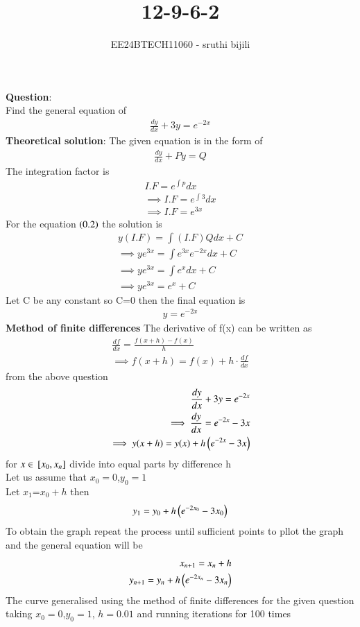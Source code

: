 \documentclass[journal]{IEEEtran}
\begin{document}

\vspace{3cm}

\title{12-9-6-2}
\author{EE24BTECH11060 - sruthi bijili}
\maketitle
\bigskip

\renewcommand{\thefigure}{\theenumi}
\renewcommand{\thetable}{\theenumi}
\textbf{Question}:\\
Find the general equation of 
\begin{align}
    \frac{dy}{dx}+3y=e^{-2x}
\end{align}
\textbf{Theoretical solution}:
The given equation is in the form of 
\begin{align}
    \frac{dy}{dx}+Py=Q
\end{align}
The integration factor is 
\begin{align}
    I.F=e^{\int p}dx\\
    \implies I.F=e^{\int 3}dx\\
    \implies  I.F=e^{3x}
\end{align}
For the equation $\left(0.2\right)$ the solution is 
\begin{align}
    y( I.F)=\int (I.F) Q dx+C\\
    \implies ye^{3x}=\int e^{3x}e^{-2x}dx+C\\
    \implies ye^{3x}=\int e^{x}dx+C\\
    \implies ye^{3x}=e^{x}+C
\end{align}
Let C be any constant so C=0 then the final equation is 
\begin{align}
    y=e^{-2x}
\end{align}
\textbf{Method of finite differences}
The derivative of f(x) can be written as 
\begin{align}
    \frac{df}{dx}=\frac{f(x+h)-f(x)}{h}\\
    \implies f(x+h)=f(x)+h\cdot\frac{df}{dx}
\end{align}
from the above question 
\begin{align}
    \frac{dy}{dx}+3y=e^{-2x}\\
    \implies \frac{dy}{dx}=e^{-2x}-3x\\
    \implies y(x+h)=y(x)+h\left(e^{-2x}-3x\right)
\end{align}
for $x \in {}\left[x_{0},x_{n}\right]$ divide into equal parts by difference h\\
Let us assume that $x_{0}=0$,$y_{0}=1$\\
Let $x_{1}$=$x_{0}+h$ then
\begin{align}
    y_{1}=y_{0}+h\left(e^{-2x_{0}}-3x_{0}\right)
\end{align}
To obtain the graph repeat the process until sufficient points to pllot the graph and the general equation will be 
\begin{align}
    x_{n+1}=x_{n}+h\\
    y_{n+1}=y_{n}+h\left(e^{-2x_{n}}-3x_{n}\right)
\end{align}
The curve generalised using the method of finite differences for the given question taking $x_{0}=0$,$y_{0}=1$, $h=0.01$ and running iterations for 100 times
\end{document}
